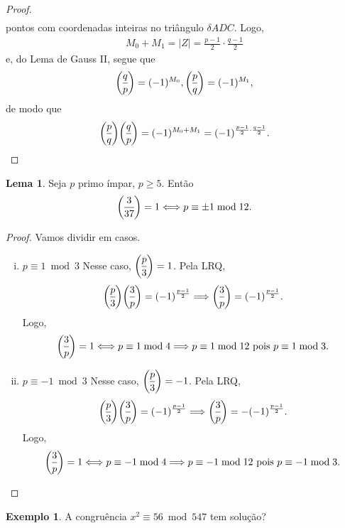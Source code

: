 \documentclass[a4paper,11pt,twoside, leqno]{article}
\newcommand{\genlegendre}[4]{%
	\genfrac{(}{)}{}{#1}{#3}{#4}%
	\if\relax\detokenize{#2}\relax\else_{\!#2}\fi
}
\newcommand{\legendre}[3][]{\genlegendre{}{#1}{#2}{#3}}
\theoremstyle{definition}
\newtheorem{lemma}[theorem]{Lema}
\newtheorem*{example}{Exemplo}
\begin{document}
\begin{proof}
\begin{align*}
	\end{align*}
	pontos com coordenadas inteiras no triângulo $\delta{ADC}$. Logo, 
	\begin{align*}
	M_0 + M_1 = |Z| = \frac{p-1}{2}\cdot\frac{q-1}{2}
	\end{align*}
	e, do Lema de Gauss II, segue que
	\begin{align*}
	\legendre[]{q}{p} = (-1)^{M_0}, \legendre[]{p}{q} = (-1)^{M_1},
	\end{align*}
	de modo que
	\begin{align*}
	\legendre[]{p}{q}\legendre[]{q}{p} = (-1)^{M_0+M_1} = (-1)^{\frac{p-1}{2}\cdot\frac{q-1}{2}}.
	\end{align*}
\end{proof}
\begin{lemma}
	\label{lema 92}
	Seja $p$ primo ímpar, $p\geq 5$. Então
	\begin{align*}
	\legendre[]{3}{37} = 1\Longleftrightarrow p\equiv \pm 1\bmod 12.
	\end{align*}
\end{lemma}
\begin{proof}
	Vamos dividir em casos.
	\begin{enumerate}[(i)]
		\item $p\equiv 1\bmod 3$
		Nesse caso, $\displaystyle{\legendre[]{p}{3} = 1}$. Pela LRQ,
		\begin{align*}
		\legendre[]{p}{3}\legendre[]{3}{p} = (-1)^{\frac{p-1}{2}} \Longrightarrow \legendre[]{3}{p} = (-1)^{\frac{p-1}{2}}.
		\end{align*}
		Logo, 
		\begin{align*}
		\legendre[]{3}{p} = 1 \Longleftrightarrow p\equiv 1\bmod 4 \Longrightarrow p\equiv 1\bmod 12\text{ pois } p\equiv 1\bmod 3.
		\end{align*}
		\item $p\equiv -1\bmod 3$
		Nesse caso, $\displaystyle{\legendre[]{p}{3} = -1}$. Pela LRQ,
		\begin{align*}
		\legendre[]{p}{3}\legendre[]{3}{p} = (-1)^{\frac{p-1}{2}} \Longrightarrow \legendre[]{3}{p} = -(-1)^{\frac{p-1}{2}}.
		\end{align*}
		Logo, 
		\begin{align*}
		\legendre[]{3}{p} = 1 \Longleftrightarrow p\equiv -1\bmod 4 \Longrightarrow p\equiv -1\bmod 12\text{ pois } p\equiv -1\bmod 3.
		\end{align*}
	\end{enumerate}
\end{proof}
\begin{example}
	A congruência $x^2\equiv 56\bmod 547$ tem solução?
\end{example}
\end{document}
